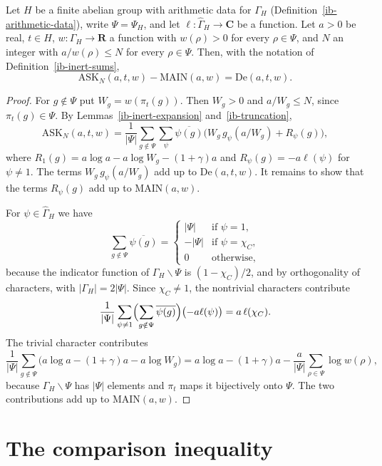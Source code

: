 \begin{theorem}\label{ib-balance-identity}
Let $H$ be a finite abelian group with arithmetic data for $\Gamma_H$
(Definition~\ref{ib-arithmetic-data}), write $\Psi=\Psi_H$, and let
$\ell:\widehat\Gamma_H\to\mathbf C$ be a function. Let $a>0$ be real, $t\in H$,
$w:\Gamma_H\to\mathbf R$ a function with $w(\rho)>0$ for every $\rho\in\Psi$, and
$N$ an integer with $a/w(\rho)\leq N$ for every $\rho\in\Psi$. Then, with the
notation of Definition~\ref{ib-inert-sums},
\[
 \mathrm{ASK}_N(a,t,w)-\mathrm{MAIN}(a,w)=\mathrm{De}(a,t,w).
\]
\end{theorem}
\begin{proof}
For $g\notin\Psi$ put $W_g=w(\pi_t(g))$. Then $W_g>0$ and $a/W_g\leq N$, since
$\pi_t(g)\in\Psi$. By Lemmas~\ref{ib-inert-expansion} and~\ref{ib-truncation},
\[
 \mathrm{ASK}_N(a,t,w)=\frac1{|\Psi|}\sum_{g\notin\Psi}\sum_\psi\overline{\psi(g)}
 \bigl(W_g\,g_\psi(a/W_g)+R_\psi(g)\bigr),
\]
where $R_1(g)=a\log a-a\log W_g-(1+\gamma)a$ and $R_\psi(g)=-a\ell(\psi)$ for
$\psi\neq1$. The terms $W_g\,g_\psi(a/W_g)$ add up to $\mathrm{De}(a,t,w)$. It
remains to show that the terms $R_\psi(g)$ add up to $\mathrm{MAIN}(a,w)$.

For $\psi\in\widehat\Gamma_H$ we have
\[
 \sum_{g\notin\Psi}\overline{\psi(g)}=
 \begin{cases}|\Psi|&\text{if }\psi=1,\\ -|\Psi|&\text{if }\psi=\chi_C,\\
 0&\text{otherwise,}\end{cases}
\]
because the indicator function of $\Gamma_H\smallsetminus\Psi$ is
$(1-\chi_C)/2$, and by orthogonality of characters, with $|\Gamma_H|=2|\Psi|$.
Since $\chi_C\neq1$, the nontrivial characters contribute
\[
 \frac1{|\Psi|}\sum_{\psi\neq1}\Bigl(\sum_{g\notin\Psi}\overline{\psi(g)}\Bigr)
 \bigl(-a\ell(\psi)\bigr)=a\,\ell(\chi_C).
\]
The trivial character contributes
\[
 \frac1{|\Psi|}\sum_{g\notin\Psi}\bigl(a\log a-(1+\gamma)a-a\log W_g\bigr)
 =a\log a-(1+\gamma)a-\frac a{|\Psi|}\sum_{\rho\in\Psi}\log w(\rho),
\]
because $\Gamma_H\smallsetminus\Psi$ has $|\Psi|$ elements and $\pi_t$ maps it
bijectively onto $\Psi$. The two contributions add up to $\mathrm{MAIN}(a,w)$.
\end{proof}

\section{The comparison inequality}\label{section-ib-comparison}

